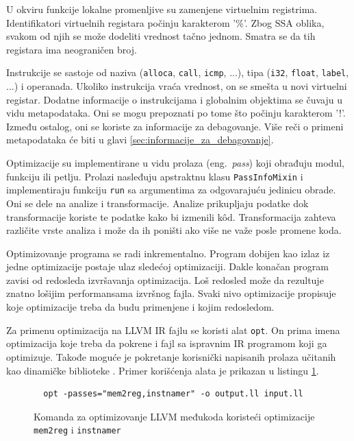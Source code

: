 \documentclass[12pt,oneside]{memoir}
\begin{document}
U okviru funkcije lokalne promenljive su zamenjene virtuelnim registrima.
Identifikatori virtuelnih registara počinju karakterom '\%'.
Zbog SSA oblika, svakom od njih se može dodeliti vrednost tačno jednom.
Smatra se da tih registara ima neograničen broj.

Instrukcije se sastoje od naziva (\verb|alloca|, \verb|call|, \verb|icmp|, ...), tipa (\verb|i32|, \verb|float|, \verb|label|, ...) i operanada.
Ukoliko instrukcija vraća vrednost, on se smešta u novi virtuelni registar.
Dodatne informacije o instrukcijama i globalnim objektima se čuvaju u vidu metapodataka.
Oni se mogu prepoznati po tome što počinju karakterom '!'.
Između ostalog, oni se koriste za informacije za debagovanje.
Više reči o primeni metapodataka će biti u glavi \ref{sec:informacije_za_debagovanje}.

Optimizacije su implementirane u vidu prolaza (eng.~{\em pass}) koji obrađuju modul, funkciju ili petlju.
Prolazi nasleđuju apstraktnu klasu \verb|PassInfoMixin| i implementiraju funkciju \verb|run| sa argumentima za odgovarajuću jedinicu obrade.
Oni se dele na analize i transformacije.
Analize prikupljaju podatke dok transformacije koriste te podatke kako bi izmenili k\^od.
Transformacija zahteva različite vrste analiza i može da ih poništi ako više ne važe posle promene koda.

Optimizovanje programa se radi inkrementalno.
Program dobijen kao izlaz iz jedne optimizacije postaje ulaz sledećoj optimizaciji.
Dakle konačan program zavisi od redosleda izvršavanja optimizacija.
Loš redosled može da rezultuje znatno lošijim performansama izvršnog fajla.
Svaki nivo optimizacije propisuje koje optimizacije treba da budu primenjene i kojim redosledom.

Za primenu optimizacija na LLVM IR fajlu se koristi alat \verb|opt|.
On prima imena optimizacija koje treba da pokrene i fajl sa ispravnim IR programom koji ga optimizuje.
Takođe moguće je pokretanje korisnički napisanih prolaza učitanih kao dinamičke biblioteke \cite{pandey2017cookbook}.
Primer korišćenja alata je prikazan u listingu \ref{lst:opt_command}.
\begin{figure}[!ht]
\begin{verbatim}
  opt -passes="mem2reg,instnamer" -o output.ll input.ll
\end{verbatim}
\caption{Komanda za optimizovanje LLVM međukoda koristeći optimizacije \texttt{mem2reg} i \texttt{instnamer}}
\label{lst:opt_command}
\end{figure}
\end{document}
